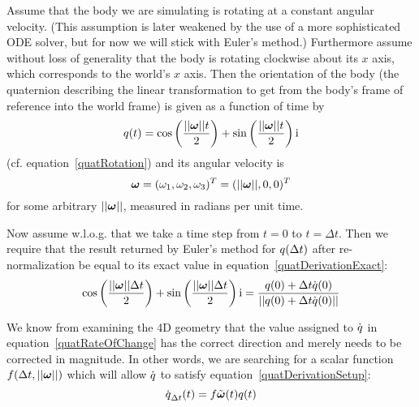 Assume that the body we are simulating is rotating at a constant angular velocity.
(This assumption is later weakened by the use of a more sophisticated ODE solver,
but for now we will stick with Euler's method.) Furthermore assume without loss of
generality that the body is rotating clockwise about its $x$ axis, which corresponds
to the world's $x$ axis. Then the orientation of the body (the quaternion describing
the linear transformation to get from the body's frame of reference into the world
frame) is given as a function of time by
\begin{equation}
\label{quatDerivationExact}
\q{q}(t) = \cos\left(\frac{\norm{\ve{\omega}}t}{2}\right) +
    \sin\left(\frac{\norm{\ve{\omega}}t}{2}\right)\qi
\end{equation}
(cf. equation~\ref{quatRotation}) and its angular velocity is
\begin{equation}
\ve{\omega} = (\omega_1, \omega_2, \omega_3)^T = (\norm{\ve{\omega}}, 0, 0)^T
\end{equation}
for some arbitrary $\norm{\ve{\omega}}$, measured in radians per unit time.

Now assume w.l.o.g. that we take a time step from $t = 0$ to $t = \Delta t$.
Then we require that the result returned by Euler's method for $\mbox{$q$}(\Delta t)$
after re-normalization be equal to its exact value in equation~\ref{quatDerivationExact}:
\begin{equation}
\label{quatDerivationSetup}
\cos\left(\frac{\norm{\ve{\omega}}\Delta t}{2}\right) +
    \sin\left(\frac{\norm{\ve{\omega}}\Delta t}{2}\right)\qi =
    \frac{\q{q}(0) + \Delta t \dot{\q{q}}(0)}
        {\norm{\q{q}(0) + \Delta t \dot{\q{q}}(0)}}
\end{equation}

We know from examining the 4D geometry that the value assigned to $\dot{\mbox{$q$}}$
in equation~\ref{quatRateOfChange} has the correct direction and merely needs to be
corrected in magnitude. In other words, we are searching for a scalar function
$f(\Delta t, \norm{\ve{\omega}})$ which will allow $\dot{\mbox{$q$}}$ to satisfy
equation~\ref{quatDerivationSetup}:
\begin{equation}
\dot{\q{q}}_{\Delta t}(t) = f\tilde{\ve{\omega}}(t)\q{q}(t)
\end{equation}

